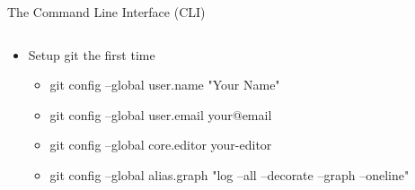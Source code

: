\documentclass[xetex]{beamer}
\begin{document}
\begin{frame}{The Command Line Interface (CLI)}
  \begin{columns}
    \begin{column}{1.05\linewidth}
      \begin{itemize}
        \item Setup git the first time
          \begin{itemize} \ttfamily \footnotesize
            \item git config --global user.name "Your Name"
            \item git config --global user.email your@email
            \item git config --global core.editor your-editor 
            \item git config --global alias.graph "log --all --decorate --graph --oneline"
          \end{itemize}
      \end{itemize}
    \end{column}
  \end{columns}


\end{frame}
\end{document}
